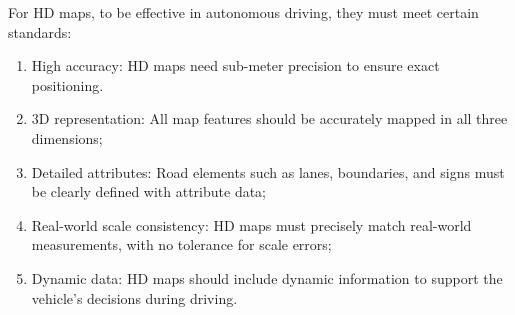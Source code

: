 For HD maps, to be effective in autonomous driving, they must meet certain standards:
\begin{enumerate}
    \item High accuracy: HD maps need sub-meter precision to ensure exact positioning.
    \item 3D representation: All map features should be accurately mapped in all three dimensions;
    \item Detailed attributes: Road elements such as lanes, boundaries, and signs must be clearly defined with attribute data;
    \item Real-world scale consistency: HD maps must precisely match real-world measurements, with no tolerance for scale errors;
    \item Dynamic data: HD maps should include dynamic information to support the vehicle’s decisions during driving.
\end{enumerate}

